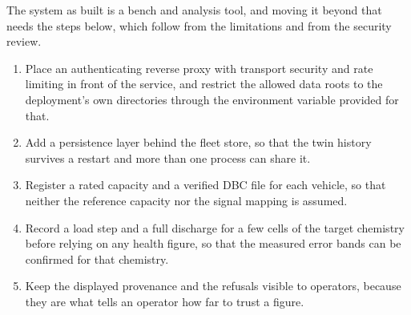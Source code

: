 \documentclass[12pt,a4paper]{amritareport}
\begin{document}
The system as built is a bench and analysis tool, and moving it beyond that needs the steps below, which follow from the limitations and from the security review.
\begin{enumerate}
	\item Place an authenticating reverse proxy with transport security and rate limiting in front of the service, and restrict the allowed data roots to the deployment's own directories through the environment variable provided for that.
	\item Add a persistence layer behind the fleet store, so that the twin history survives a restart and more than one process can share it.
	\item Register a rated capacity and a verified DBC file for each vehicle, so that neither the reference capacity nor the signal mapping is assumed.
	\item Record a load step and a full discharge for a few cells of the target chemistry before relying on any health figure, so that the measured error bands can be confirmed for that chemistry.
	\item Keep the displayed provenance and the refusals visible to operators, because they are what tells an operator how far to trust a figure.
\end{enumerate}
\end{document}
